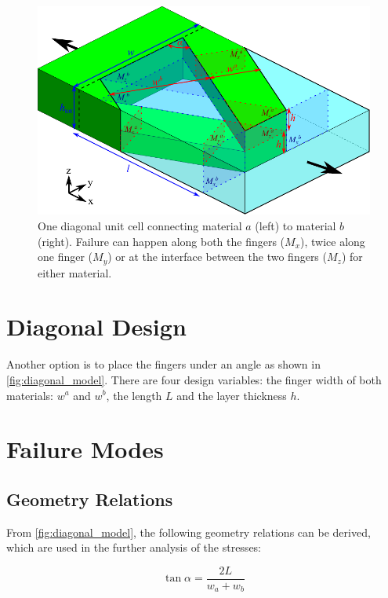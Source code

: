 
\begin{figure}[H]
	\centering
	\includegraphics[width=\columnwidth]{sources/method/diagonal_model_v3.pdf}
	\caption{
		One diagonal unit cell connecting material $a$ (left) to material $b$ (right).
		Failure can happen along both the fingers ($M_x$), twice along one finger ($M_y$) or at the interface between the two fingers ($M_z$) for either material.}
	\label{fig:diagonal_model}
\end{figure}



\section{Diagonal Design}

Another option is to place the fingers under an angle as shown in \autoref{fig:diagonal_model}.
There are four design variables: the finger width of both materials: $w^a$ and $w^b$, the length $L$ and the layer thickness $h$.

\section{Failure Modes}
\subsection{Geometry Relations}
From \autoref{fig:diagonal_model}, the following geometry relations can be derived, which are used in the further analysis of the stresses:

\begin{equation}
	\label{eq:tan}
	\tan \alpha = \frac{2L}{w_a + w_b}
\end{equation}

